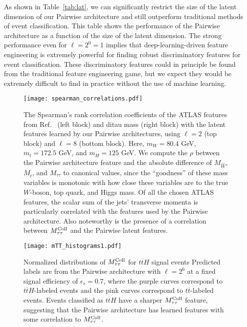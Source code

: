 \documentclass[aps,prd,twocolumn,superscriptaddress,floatfix,longbibliography,preprintnumbers,nofootinbib]{revtex4-1} %
\DeclareRobustCommand{\Tab}[1]{Table~\ref{tab:#1}}
\DeclareRobustCommand{\RRef}[1]{Ref.~\cite{#1}}
\begin{document}
As shown in \Tab{lat}, we can significantly restrict the size of the latent dimension of our Pairwise architecture and still outperform traditional methods of event classification.
%
This table shows the performance of the Pairwise architecture as a function of the size of the latent dimension.
%
The strong performance even for $\ell=2^0 = 1$ implies that deep-learning-driven feature engineering is extremely powerful for finding robust discriminatory features for event classification.
%
These discriminatory features could in principle be found from the traditional feature engineering game, but we expect they would be extremely difficult to find in practice without the use of machine learning.





\begin{figure*}
 \begin{center}
 \texttt{[image: spearman\_correlations.pdf]}
 \end{center}
 \caption{
   The Spearman's rank correlation coefficients of the ATLAS features from \RRef{ATLAS:2022yrq} (left block) and ditau mass (right block) with the latent features learned by our Pairwise architectures, using $\ell=2$ (top block) and $\ell=8$ (bottom block).
   Here, \(m_W=80.4\) GeV, \(m_t=172.5\) GeV, and \(m_H=125\) GeV.
   We compute the \(\rho\) between the Pairwise architecture feature and the absolute difference of \(M_{\hat{W}}\), \(M_{\hat{t}}\), and \(M_{\tau\tau}\) to canonical values, since the ``goodness'' of these mass variables is monotonic with how close these variables are to the true \(W\)-boson, top quark, and Higgs mass.
   Of all the chosen ATLAS features, the scalar sum of the jets' transverse momenta is particularly correlated with the features used by the Pairwise architecture.
   Also noteworthy is the presence of a correlation between \(M^{\rm Coll}_{\tau\tau}\) and the Pairwise latent features.
 }
 \label{fig:spearman} 
\end{figure*}
\begin{figure}[t]
   \texttt{[image: mTT\_histograms1.pdf]}
 \caption{
Normalized distributions of $M^{\rm Coll}_{\tau\tau}$ for  $t\overline{t}H$ signal events 
%
Predicted labels are from the Pairwise architecture with $\ell=2^6$ at a fixed signal efficiency of $\epsilon_s=0.7$, where the purple curves correspond to $t\overline{t}H$-labeled events and the pink curves correspond to $t\overline{t}$-labeled events.
%
Events classified as $t\overline{t}H$ have a sharper $M^{\rm Coll}_{\tau\tau}$ feature, suggesting that the Pairwise architecture has learned features with some correlation to $M^{\rm Coll}_{\tau\tau}$.
%
 }

\label{fig:mtt1}
\end{figure}
\end{document}
